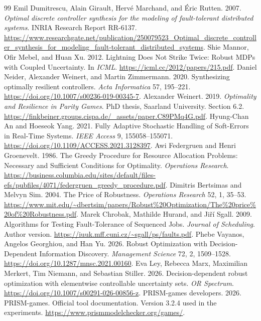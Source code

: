 \documentclass[acmsmall,screen,review,anonymous]{acmart}
\begin{document}
\begin{thebibliography}{99}
 Emil Dumitrescu, Alain Girault, Herv\'e Marchand, and \'{E}ric Rutten. 2007. \emph{Optimal discrete controller synthesis for the modeling of fault-tolerant distributed systems}. INRIA Research Report RR-6137. \url{https://www.researchgate.net/publication/250079523_Optimal_discrete_controller_synthesis_for_modeling_fault-tolerant_distributed_systems}.
 Shie Mannor, Ofir Mebel, and Huan Xu. 2012. Lightning Does Not Strike Twice: Robust MDPs with Coupled Uncertainty. In \emph{ICML}. \url{https://icml.cc/2012/papers/215.pdf}.
 Daniel Neider, Alexander Weinert, and Martin Zimmermann. 2020. Synthesizing optimally resilient controllers. \emph{Acta Informatica} 57, 195--221. \url{https://doi.org/10.1007/s00236-019-00345-7}.
 Alexander Weinert. 2019. \emph{Optimality and Resilience in Parity Games}. PhD thesis, Saarland University. Section 6.2. \url{https://finkbeiner.groups.cispa.de/_assets/paper.C89PMq4G.pdf}.
 Hyung-Chan An and Hoeseok Yang. 2021. Fully Adaptive Stochastic Handling of Soft-Errors in Real-Time Systems. \emph{IEEE Access} 9, 155058--155071. \url{https://doi.org/10.1109/ACCESS.2021.3128397}.
 Awi Federgruen and Henri Groenevelt. 1986. The Greedy Procedure for Resource Allocation Problems: Necessary and Sufficient Conditions for Optimality. \emph{Operations Research}. \url{https://business.columbia.edu/sites/default/files-efs/pubfiles/4071/federgruen_greedy_procedure.pdf}.
 Dimitris Bertsimas and Melvyn Sim. 2004. The Price of Robustness. \emph{Operations Research} 52, 1, 35--53. \url{https://www.mit.edu/~dbertsim/papers/Robust%20Optimization/The%20price%20of%20Robustness.pdf}.
 Marek Chrobak, Mathilde Hurand, and Ji\v{r}\'{i} Sgall. 2009. Algorithms for Testing Fault-Tolerance of Sequenced Jobs. \emph{Journal of Scheduling}. Author version. \url{https://iuuk.mff.cuni.cz/~sgall/ps/faults.pdf}.
 Phebe Vayanos, Angelos Georghiou, and Han Yu. 2026. Robust Optimization with Decision-Dependent Information Discovery. \emph{Management Science} 72, 2, 1509--1528. \url{https://doi.org/10.1287/mnsc.2021.00160}.
 Eva Ley, Rebecca Marx, Maximilian Merkert, Tim Niemann, and Sebastian Stiller. 2026. Decision-dependent robust optimization with elementwise controllable uncertainty sets. \emph{OR Spectrum}. \url{https://doi.org/10.1007/s00291-026-00856-z}.
 PRISM-games developers. 2026. PRISM-games. Official tool documentation. Version 3.2.4 used in the experiments. \url{https://www.prismmodelchecker.org/games/}.


\end{thebibliography}
\end{document}
